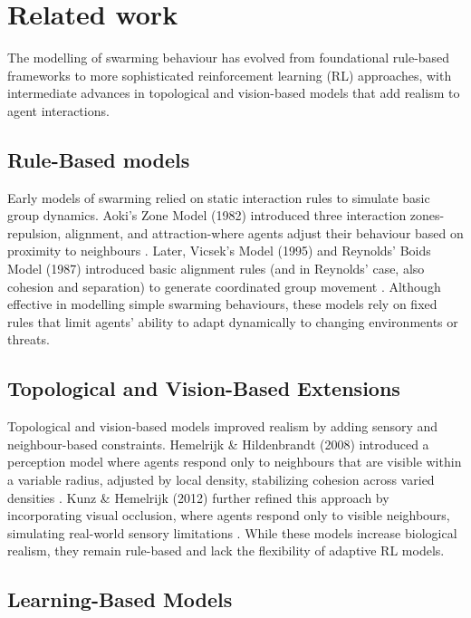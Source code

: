 \documentclass[9pt]{pnas-new}
\begin{document}
\section*{Related work}
The modelling of swarming behaviour has evolved from foundational rule-based frameworks to more sophisticated reinforcement learning (RL) approaches, with intermediate advances in topological and vision-based models that add realism to agent interactions.

\subsection{Rule-Based models}
Early models of swarming relied on static interaction rules to simulate basic group dynamics. 
Aoki's Zone Model (1982) introduced three interaction zones-repulsion, alignment, and attraction-where agents adjust their behaviour based on proximity to neighbours \cite{aoki1987zones}. 
Later, Vicsek's Model (1995) and Reynolds' Boids Model (1987) introduced basic alignment rules (and in Reynolds' case, also cohesion and separation) to generate coordinated group movement \cite{Vicsek1995}\cite{reynolds1987boids}. 
Although effective in modelling simple swarming behaviours, these models rely on fixed rules that limit agents' ability to adapt dynamically to changing environments or threats.

\subsection{Topological and Vision-Based Extensions}

Topological and vision-based models improved realism by adding sensory and neighbour-based constraints. 
Hemelrijk \& Hildenbrandt (2008) introduced a perception model where agents respond only to neighbours that are visible within a variable radius, adjusted by local density, stabilizing cohesion across varied densities \cite{Hemelrijk2008}. 
Kunz \& Hemelrijk (2012) further refined this approach by incorporating visual occlusion, where agents respond only to visible neighbours, simulating real-world sensory limitations \cite{kunz2012}. While these models increase biological realism, they remain rule-based and lack the flexibility of adaptive RL models.

\subsection{Learning-Based Models}
\end{document}
